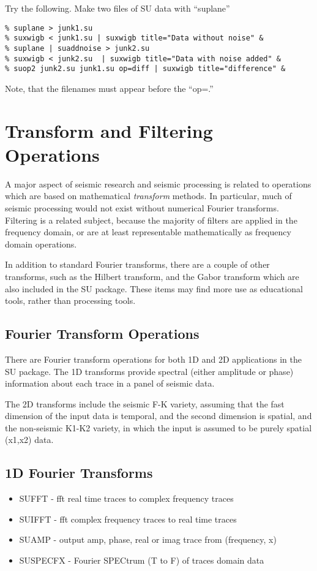 {{{{{{{Try the following. Make two files of SU data with ``suplane''
{\small\begin{verbatim}
% suplane > junk1.su
% suxwigb < junk1.su | suxwigb title="Data without noise" &
% suplane | suaddnoise > junk2.su
% suxwigb < junk2.su  | suxwigb title="Data with noise added" &
% suop2 junk2.su junk1.su op=diff | suxwigb title="difference" &
\end{verbatim}}\noindent
Note, that the filenames must appear before the ``op=.'' 

\section{Transform and Filtering Operations}

A major aspect of seismic research and seismic processing is
related to operations which are based on mathematical {\em transform\/} 
methods.
In particular, much of seismic processing would not exist without
numerical Fourier transforms.
Filtering is a related subject, because the majority of filters
are applied in the frequency domain, or are at least representable
mathematically as frequency domain operations.

In addition to standard Fourier transforms, there are a couple
of other transforms, such as the Hilbert transform, and the Gabor
transform which are also included in the SU package.
These items may find more use as educational tools, rather than
processing tools.

\subsection{Fourier Transform Operations}

There are Fourier transform operations for both 1D and 2D applications
in the SU package.
The 1D transforms provide spectral (either amplitude or phase)
information about each trace in a panel of seismic data.

The 2D transforms include the seismic F-K variety,
assuming that the fast dimension of the input data is temporal, and
the second dimension is spatial, and the non-seismic  K1-K2
variety, in which the input is assumed to be purely spatial (x1,x2)
data.

\subsection{1D Fourier Transforms}
\begin{itemize}
\item SUFFT - fft real time traces to complex frequency traces
\item SUIFFT - fft complex frequency traces to real time traces
\item SUAMP - output amp, phase, real or imag trace from (frequency, x)
\item SUSPECFX - Fourier SPECtrum (T to F) of traces 
domain data
\end{itemize}

}}}}}}}
